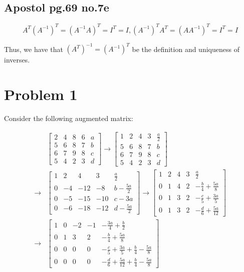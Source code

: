 \documentclass[12pt,letterpaper]{article}
\theoremstyle{definition}
\begin{document}
\subsection*{Apostol pg.69 no.7e}
\[
  A^T(A^{-1})^T = (A^{-1}A)^T = I^T = I, (A^{-1})^TA^T = (AA^{-1})^T = I^T = I
\]

Thus, we have that $(A^T)^{-1} = (A^{-1})^T$ be the definition and uniqueness of inverses.

\section*{Problem 1}

Consider the following augmented matrix:

\begin{align*}
  &\begin{bmatrix}
    2 & 4 & 8 & 6 & a \\
    5 & 6 & 8 & 7 & b \\
    6 & 7 & 9 & 8 & c \\
    5 & 4 & 2 & 3 & d 
  \end{bmatrix} \rightarrow
                  \begin{bmatrix}
                    1 & 2 & 4 & 3 & \frac{a}{2} \\
                    5 & 6 & 8 & 7 & b \\
                    6 & 7 & 9 & 8 & c \\
                    5 & 4 & 2 & 3 & d 
                  \end{bmatrix} \\
  \rightarrow&
  \begin{bmatrix}
    1 & 2 & 4 & 3 & \frac{a}{2} \\
    0 & -4 & -12 & -8 & b - \frac{5a}{2} \\
    0 & -5 & -15 & -10 & c - 3a \\
    0 & -6 & -18 & -12 & d - \frac{5a}{2} 
  \end{bmatrix} \rightarrow
                  \begin{bmatrix}
                    1 & 2 & 4 & 3 & \frac{a}{2} \\
                    0 & 1 & 4 & 2 & - \frac{b}{4} + \frac{5a}{8} \\
                    0 & 1 & 3 & 2 & -\frac{c}{5} + \frac{3a}{5} \\
                    0 & 1 & 3 & 2 & -\frac{d}{6} + \frac{5a}{12} 
                  \end{bmatrix} \\
  \rightarrow&
  \begin{bmatrix}
    1 & 0 & -2 & -1 & -\frac{3a}{4} + \frac{b}{2} \\
    0 & 1 & 3 & 2 & - \frac{b}{4} + \frac{5a}{8} \\
    0 & 0 & 0 & 0 & -\frac{c}{5} + \frac{3a}{5} + \frac{b}{4} - \frac{5a}{8}\\
    0 & 0 & 0 & 0 & -\frac{d}{6} + \frac{5a}{12} + \frac{b}{4} - \frac{5a}{8}
  \end{bmatrix}
\end{align*}
\end{document}
